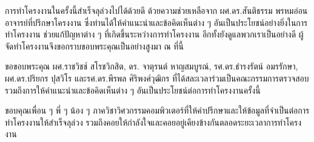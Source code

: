 \documentclass[12pt,oneside,openright,a4paper]{cpe-thai-project}
\begin{document}

\preface
\hspace{1cm}การทําโครงงานในครั้งนี้สำเร็จลุล่วงไปได้ด้วยดี ด้วยความช่วยเหลือจาก ผศ.ดร.สันติธรรม พรหมอ่อน อาจารย์ที่ปรึกษาโครงงาน 
ซึ่งท่านได้ให้คําแนะนําและข้อคิดเห็นต่าง ๆ อันเป็นประโยชน์อย่างยิ่งในการทําโครงงาน ช่วยแก้ปัญหาต่าง ๆ ที่เกิดขึ้นระหว่างการทําโครงงาน 
อีกทั้งยังดูแลพวกเราเป็นอย่างดี ผู้จัดทําโครงงานจึงขอกราบขอบพระคุณเป็นอย่างสูงมา ณ ที่นี้

\hspace{1cm}ขอขอบพระคุณ ผศ.ราชวิชช์ สโรชวิกสิต, ดร. จาตุรนต์ หาญสมบูรณ์, รศ.ดร.ธำรงรัตน์ อมรรักษา, ผศ.ดร.ปริยกร ปุสวิโร และรศ.ดร.พีรพล ศิริพงศ์วุฒิกร 
ที่ได้สละเวลาร่วมเป็นคณะกรรมการตรวจสอบ รวมถึงการให้คําแนะนําและข้อคิดเห็นต่าง ๆ อันเป็นประโยชน์ต่อการทําโครงงานครั้งนี้

\hspace{1cm}ขอบคุณเพื่อน ๆ พี่ ๆ น้อง ๆ ภาควิชาวิศวกรรมคอมพิวเตอร์ที่ให้คําปรึกษาและให้ข้อมูลที่จําเป็นต่อการทําโครงงานให้สำเร็จลุล่วง 
รวมถึงคอยให้กําลังใจและคอยอยู่เคียงข้างกันตลอดระยะเวลาการทําโครงงาน

\tableofcontents                    
\listoftables
\listoffigures                      

\end{document}
